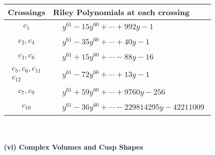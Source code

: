 \documentclass[1p]{elsarticle_modified}
\theoremstyle{definition}
\begin{document}
\begin{tabular}{m{50pt}|m{274pt}}
Crossings & \hspace{64pt}Riley Polynomials at each crossing \\
\hline $$\begin{aligned}c_{1}\end{aligned}$$&$\begin{aligned}
&y^{61}-15 y^{60}+\cdots+992 y-1
\end{aligned}$\\
\hline $$\begin{aligned}c_{2},c_{4}\end{aligned}$$&$\begin{aligned}
&y^{61}-35 y^{60}+\cdots+40 y-1
\end{aligned}$\\
\hline $$\begin{aligned}c_{3},c_{8}\end{aligned}$$&$\begin{aligned}
&y^{61}+15 y^{60}+\cdots-88 y-16
\end{aligned}$\\
\hline $$\begin{aligned}c_{5},c_{6},c_{11}\\c_{12}\end{aligned}$$&$\begin{aligned}
&y^{61}-72 y^{60}+\cdots+13 y-1
\end{aligned}$\\
\hline $$\begin{aligned}c_{7},c_{9}\end{aligned}$$&$\begin{aligned}
&y^{61}+59 y^{60}+\cdots+9760 y-256
\end{aligned}$\\
\hline $$\begin{aligned}c_{10}\end{aligned}$$&$\begin{aligned}
&y^{61}-36 y^{60}+\cdots-229814295 y-42211009
\end{aligned}$\\
\hline
\end{tabular}\\~\\
\newpage\flushleft \textbf{(vi) Complex Volumes and Cusp Shapes}
\end{document}
